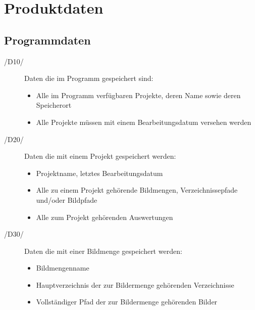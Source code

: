 \section{Produktdaten}

\subsection{Programmdaten}

\begin{description}
	
	\item[/D10/] Daten die im Programm gespeichert sind:
	
	\begin{itemize} 
			
			\item Alle im Programm verfügbaren Projekte, deren Name sowie deren Speicherort
	
			\item Alle Projekte müssen mit einem Bearbeitungsdatum versehen werden
	
	\end{itemize}

	\item[/D20/] Daten die mit einem Projekt gespeichert werden:
	
	\begin{itemize}
		
		\item Projektname, letztes Bearbeitungsdatum
		
		\item Alle zu einem Projekt gehörende Bildmengen, Verzeichnissepfade und/oder Bildpfade
		
		\item Alle zum Projekt gehörenden Auswertungen
	
	\end{itemize}

	\item[/D30/] Daten die mit einer Bildmenge gespeichert werden:
	
	\begin{itemize}
	
		\item Bildmengenname
		
		\item Hauptverzeichnis der zur Bildermenge gehörenden Verzeichnisse
		
		\item Vollständiger Pfad der zur Bildermenge gehörenden Bilder
		

\end{itemize}
\end{description}
